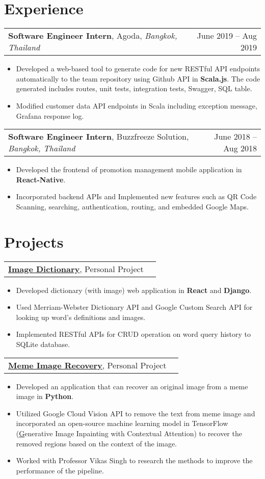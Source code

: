 \documentclass[letterpaper,11pt]{article}
\makeatletter
\newcommand{\exptitle}[4]{
  \vspace{7pt}
  \begin{tabular*}{1.00\textwidth}[t]{l@{\extracolsep{\fill}}r}
    \textbf{#1}, #2, \textit{#3} & #4 \\
  \end{tabular*}\vspace{-5pt}
}
\newcommand{\projtitle}[2]{
  \vspace{7pt}
  \begin{tabular*}{1.00\textwidth}[t]{l@{\extracolsep{\fill}}r}
    \textbf{#1}, #2 \\
  \end{tabular*}\vspace{-5pt}
}
\newcommand{\expstart}{\begin{itemize}[leftmargin=5mm]}
\newcommand{\expend}{\end{itemize}\vspace{-5pt}}
\newcommand{\expitem}[1]{\item\small{{#1 \vspace{-5pt}}}}
\makeatother
\begin{document}
\section{Experience}
 \vspace{-6pt}
  \exptitle{Software Engineer Intern}{Agoda}{Bangkok, Thailand}{June 2019 – Aug 2019}
  \expstart
    \expitem{Developed a web-based tool to generate code for new RESTful API endpoints automatically to the team repository using Github API in \textbf{Scala.js}. The code generated includes routes, unit tests, integration tests, Swagger, SQL table. }
    \expitem{Modified customer data API endpoints in Scala including exception message, Grafana response log. }
  \expend
  
  \exptitle{Software Engineer Intern}{Buzzfreeze Solution}{Bangkok, Thailand}{June 2018 – Aug 2018}
  \expstart
    \expitem{Developed the frontend of promotion management mobile application in \textbf{React-Native}. }
    \expitem{Incorporated backend APIs and Implemented new features such as QR Code Scanning, searching, authentication, routing, and embedded Google Maps. }
  \expend

\section{Projects}
  \vspace{-6pt}
  \projtitle{\href{https://github.com/newsatit/image-dictionary}{Image Dictionary}}{Personal Project}
  \expstart
    \expitem{Developed dictionary (with image) web application in \textbf{React} and \textbf{Django}.}
    \expitem{Used Merriam-Webster Dictionary API and Google Custom Search API for looking up word's definitions and images. }
    \expitem{Implemented RESTful APIs for CRUD operation on word query history to SQLite database.}
  \expend
 
  \projtitle{\href{https://github.com/newsatit/meme_image_recovery}{Meme Image Recovery}}{Personal Project}
  \expstart
    \expitem{Developed an application that can recover an original image from a meme image in \textbf{Python}.}
    \expitem{Utilized Google Cloud Vision API  to remove the text from meme image and incorporated an open-source machine learning model in TensorFlow (\href{https://github.com/JiahuiYu/generative_inpainting}Generative Image Inpainting with Contextual Attention) to recover the removed regions based on the context of the image.}
    \expitem{Worked with Professor Vikas Singh to research the methods to improve the performance of the pipeline.}
  \expend
  
\end{document}
